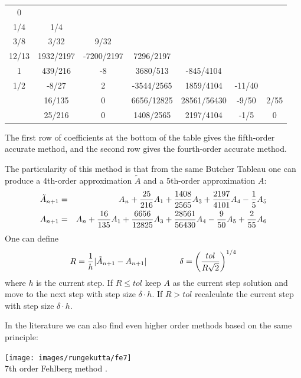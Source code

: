 \begin{mdframed}[backgroundcolor=blue!5]
\begin{tabular}{c|cccccc}
0 & \\
1/4 	&1/4\\ 
3/8 	&3/32 		&9/32 \\
12/13 	&1932/2197 	&-7200/2197 &	7296/2197\\
1 	&439/216 	&-8 	&3680/513 &	-845/4104\\
1/2 	&-8/27 		&2 	&-3544/2565& 	1859/4104 &	-11/40 	\\
\hline
&16/135 	&0 		&6656/12825 	&28561/56430 	&-9/50& 	2/55\\
&25/216 	&0 	&1408/2565 	&2197/4104 	&-1/5 	&0 
\end{tabular}
\end{mdframed}


The first row of coefficients at the bottom of the table gives the fifth-order 
accurate method, and the second row gives the fourth-order accurate method. 

The particularity of this method is that from the same Butcher Tableau one 
can produce a 4th-order approximation $\tilde{A}$ and a 5th-order approximation $A$:
\begin{eqnarray}
\tilde{A}_{n+1}&=&A_n + \frac{25}{216}A_1 + \frac{1408}{2565}A_3+\frac{2197}{4101}A_4 -\frac15 A_5 \nonumber\\
A_{n+1}&=&A_n + \frac{16}{135}A_1 + \frac{6656}{12825}A_3+\frac{28561}{56430}A_4 \nonumber
-\frac{9}{50} A_5 + \frac{2}{55} A_6
\end{eqnarray}
One can define 
\[
R=\frac{1}{h} | \tilde{A}_{n+1} - A_{n+1} | \nonumber\\
\qquad\qquad
\delta = \left( \frac{tol}{R \sqrt 2} \right)^{1/4}
\]
where $h$ is the current step.
If $R \le tol$ keep $A$ as the current step solution and move to the next step with step size $\delta  \cdot h$.
If $R > tol$ recalculate the current step with step size $\delta  \cdot h$. 

In the literature we can also find even higher order methods 
based on the same principle:

\begin{center}
\texttt{[image: images/rungekutta/fe7]}\\
{\captionfont 7th order Fehlberg method \cite{bujk16}.}
\end{center}


